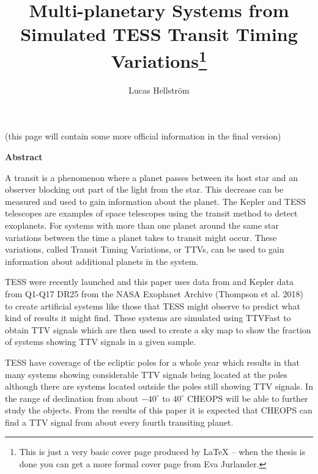 \documentclass[12pt]{report}
\begin{document}
\title{\huge \bf Multi-planetary Systems from Simulated TESS Transit Timing Variations\footnote{This is just a very basic cover page produced by LaTeX -- when
the thesis is done you can get a more formal cover page from Eva Jurlander.}}
\author{Lucas Hellström}

\thispagestyle{empty} %

\maketitle

\newpage

\thispagestyle{empty}

\begin{center}
  (this page will contain some more official information in the final version)
\end{center}

\newpage

\thispagestyle{empty}

\begin{center}
  {\bf Abstract}
\end{center}
	A transit is a phenomenon where a planet passes between its host star and an observer blocking out part of the light from the star. This decrease can be measured and used to gain information about the planet. The Kepler and TESS telescopes are examples of space telescopes using the transit method to detect exoplanets. For systems with more than one planet around the same star variations between the time a planet takes to transit might occur. These variations, called Transit Timing Variations, or TTVs, can be used to gain information about additional planets in the system.
	
	TESS were recently launched and this paper uses data from \cite{2015ApJ...809...77S} and Kepler data from Q1-Q17 DR25 from the NASA Exoplanet Archive (Thompson et al. 2018) to create artificial systems like those that TESS might observe to predict what kind of results it might find. These systems are simulated using TTVFast \citep{2014ApJ...787..132D} to obtain TTV signals which are then used to create a sky map to show the fraction of systems showing TTV signals in a given sample.
	
	TESS have coverage of the ecliptic poles for a whole year which results in that many systems showing considerable TTV signals being located at the poles although there are systems located outside the poles still showing TTV signals. In the range of declination from about $-40^{\circ}$ to $40^{\circ}$ CHEOPS will be able to further study the objects. From the results of this paper it is expected that CHEOPS can find a TTV signal from about every fourth transiting planet. 
	
\end{document}
